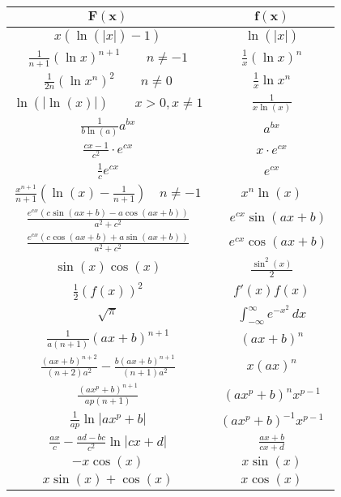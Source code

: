 \documentclass[a4paper, 10pt]{article}
\theoremstyle{definition}
\begin{document}
\begin{center}
\begin{tabular}{c|c}
    $\mathbf{F(x)}$ & $\mathbf{f(x)}$ \\
    \midrule
    $x  (\ln(|x|) - 1)$ & $\ln(|x|)$ \\
    $\frac{1}{n+1} (\ln x)^{n+1} \quad \quad n \neq -1 $ & $ \frac{1}{x}(\ln x)^n$ \\
    $\frac{1}{2n} (\ln x^n)^{2} \quad \quad n \neq 0 $ & $ \frac{1}{x}\ln x^n$ \\
    $\ln(|\ln(x)|) \quad \quad x > 0, x \neq 1$ & $\frac{1}{x \ln(x)}$ \\
    $\frac{1}{b \ln(a)} a^{bx}$ & $a^{bx}$ \\
    $\frac{cx - 1}{c^2} \cdot e^{cx}$ & $x \cdot e^{cx}$ \\
    $\frac{1}{c}e^{cx}$ & $e^{cx}$ \\
    $\frac{x^{n + 1}}{n + 1} \left(\ln(x) - \frac{1}{n + 1}\right) \quad n \neq -1 $ & $x^n \ln(x)$ \\
    $\frac{e^{cx} \left(c \sin(ax + b) - a \cos(ax + b) \right)}{a^2 + c^2}$ & $\quad e^{cx} \sin (ax + b) $ \\
    $\frac{e^{cx} \left(c \cos (ax + b) + a \sin(ax + b) \right)}{a^2 + c^2}$ & $\quad e^{cx} \cos (ax+b)$ \\
    $\sin(x)\cos(x)$ & $\frac{\sin^2(x)}{2}$ \\
    $\frac{1}{2}(f(x))^2$ & $f'(x) f(x)$ \\
    $\sqrt{\pi}$ & $\int_{-\infty}^\infty e^{-x^2} \,dx$ \\
    $\frac{1}{a(n+1)}(ax+b)^{n+1}$ & $(ax+b)^n$ \\
    $\frac{(ax+b)^{n+2}}{(n+2)a^2} - \frac{b(ax+b)^{n+1}}{(n+1)a^2}$ & $x(ax)^n$ \\
    $\frac{(ax^p+b)^{n+1}}{ap(n+1)}$ & $(ax^p+b)^n x^{p-1}$ \\
    $\frac{1}{ap} \ln |ax^p + b|$ & $(ax^p + b)^{-1} x^{p-1}$ \\
    $\frac{ax}{c} - \frac{ad-bc}{c^2} \ln |cx +d|$ & $\frac{ax+b}{cx+d}$ \\
    $- x \cos (x)$ & $x \sin (x)$ \\
    $x \sin(x) + \cos (x)$ & $x \cos (x)$ \\
\end{tabular}
\end{center}
\end{document}
